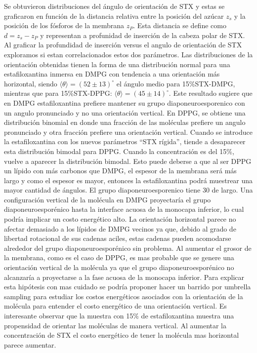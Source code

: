 Se obtuvieron distribuciones del \'{a}ngulo de orientaci\'{o}n de STX y estas se graficaron en funci\'{o}n de la distancia relativa entre la posici\'{o}n  del az\'{u}car $z_s$ y la posici\'{o}n de los f\'{o}sforos de la membrana $z_P$. Esta distancia se define como $d=z_s-z_P$ y representan a profunidad de inserci\'{o}n de la cabeza polar de STX. Al graficar la profundidad de inserci\'{o}n versus el angulo de orientaci\'{o}n de STX exploramos si estan correlacionados estos dos par\'{a}metros. Las distribuciones de la orientaci\'{o}n obtenidas tienen la forma de una distribuci\'{o}n normal para una estafiloxantina inmersa en DMPG con tendencia a una orientaci\'{o}n m\'{a}s horizontal, siendo $\langle\theta\rangle=(52\pm13)^{\circ}$ el \'{a}ngulo medio para 15\%STX-DMPG, mientras que para 15\%STX-DPPG: $\langle\theta\rangle=(45\pm14)^{\circ}$. Este resultado sugiere que en DMPG estafiloxantina prefiere mantener  su grupo diaponeuroesporenico con un angulo pronunciado y no una orientaci\'{o}n vertical. En DPPG, se obtiene una distribuci\'{o}n binomial en donde una fracci\'{o}n de las mol\'{e}culas prefiere un angulo pronunciado y otra fracci\'{o}n prefiere una orientaci\'{o}n vertical. Cuando se introduce la estafiloxantina con los nuevos par\'{a}metros ``STX r\'{i}gida'', tiende a desaparecer esta distribuci\'{o}n bimodal para DPPG. Cuando la concentraci\'{o}n es del 15\%, vuelve a aparecer la distribuci\'{o}n bimodal. Esto puede deberse a que al ser DPPG un l\'{i}pido con m\'{a}s carbonos que DMPG, el espesor de la membrana ser\'{a} m\'{a}s largo y como el espesor es mayor, entonces la estafiloxantina podr\'{a} muestrear una mayor cantidad de \'{a}ngulos. El grupo diaponeuroesporenico tiene 30 de largo. Una configuraci\'{o}n vertical de la mol\'{e}cula en DMPG proyectar\'{i}a el grupo diaponeuroespor\'{e}nico hasta la interface acuosa de la monocapa inferior, lo cual podr\'{i}a implicar un costo energ\'{e}tico alto. La orientaci\'{o}n horizontal parece no afectar demasiado a los l\'{i}pidos de DMPG vecinos ya que, debido al grado de libertad rotacional de sus cadenas aciles, estas cadenas pueden acomodarse alrededor del grupo diaponeuroespor\'{e}nico sin problema.  Al aumentar el grosor de la membrana, como es el caso de DPPG, es mas probable que se genere una orientaci\'{o}n vertical de la mol\'{e}cula ya que el grupo diaponeuroespor\'{e}nico no alcanzar\'{i}a a proyectarse a la fase acuosa de la monocapa inferior. Para explicar esta hip\'{o}tesis con mas cuidado se podr\'{i}a proponer hacer un barrido por umbrella sampling para estudiar los costos energ\'{e}ticos asociados con la orientaci\'{o}n de la mol\'{e}cula para entender el costo energ\'{e}tico de una orientaci\'{o}n vertical. Es interesante observar que la muestra con 15\% de estafiloxantina muestra una propensidad de orientar las mol\'{e}culas de manera vertical. Al aumentar la concentraci\'{o}n de STX el costo energ\'{e}tico de tener la mol\'{e}cula mas horizontal parece aumentar. \\

